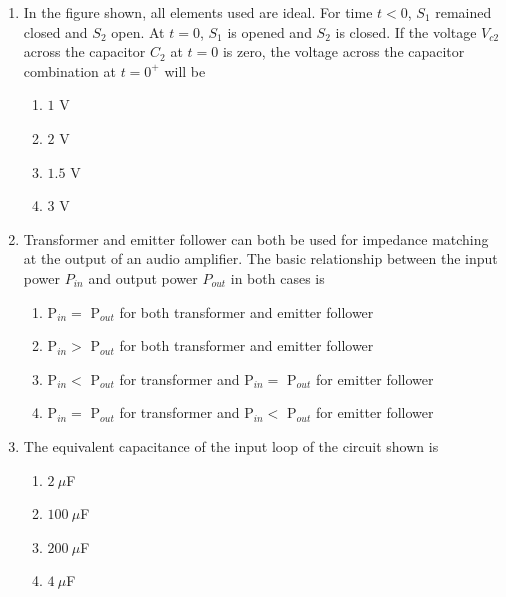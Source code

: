 \documentclass[journal,9pt,onecolumn]{IEEEtran}
\begin{document}
\begin{enumerate}
\item In the figure shown, all elements used are ideal. For time $t < 0$, $S_1$ remained closed and $S_2$ open. At $t=0$, $S_1$ is opened and $S_2$ is closed. If the voltage $V_{c2}$ across the capacitor $C_2$ at $t=0$ is zero, the voltage across the capacitor combination at $t=0^{+}$ will be
\begin{center}
    
\end{center}
\begin{multicols}{4}
\begin{enumerate}
    \item $1$ V
    \item $2$ V
    \item $1.5$ V
    \item $3$ V
\end{enumerate}
\end{multicols}


\item Transformer and emitter follower can both be used for impedance matching at the output of an audio amplifier. The basic relationship between the input power $P_{in}$ and output power $P_{out}$ in both cases is
\begin{enumerate}
    \item P$_{in} = $ P$_{out}$ for both transformer and emitter follower
    \item P$_{in} > $ P$_{out}$ for both transformer and emitter follower
    \item P$_{in} < $ P$_{out}$ for transformer and P$_{in} = $ P$_{out}$ for emitter follower
    \item P$_{in} = $ P$_{out}$ for transformer and P$_{in} < $ P$_{out}$ for emitter follower
\end{enumerate}


\item The equivalent capacitance of the input loop of the circuit shown is
\begin{center}
    
\end{center}
\begin{multicols}{4}
\begin{enumerate}
    \item $2~\mu$F
    \item $100~\mu$F
    \item $200~\mu$F
    \item $4~\mu$F
\end{enumerate}
\end{multicols}

\end{enumerate}
\end{document}

